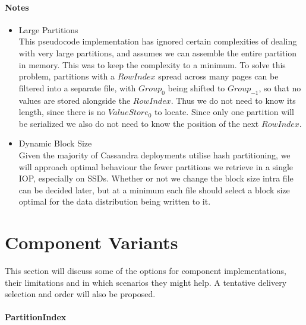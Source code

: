 \documentclass[fleqn]{article}
\begin{document}
\paragraph{Notes}
\small
\begin{itemize}
  \item Large Partitions\\[2pt]
    This pseudocode implementation has ignored certain complexities of dealing with very large
    partitions, and assumes we can assemble the entire partition in memory. This was to keep
    the complexity to a minimum. To solve this problem,
    partitions with a $RowIndex$ spread across many pages can be filtered into a separate
    file, with $Group_0$ being shifted to $Group_{-1}$, so that no values are stored alongside
    the $RowIndex$. Thus we do not need to know its length, since there is no $ValueStore_0$ to locate.
    Since only one partition will be serialized we also do not need to know the position of the next $RowIndex$.
  \item Dynamic Block Size\\[2pt]
    Given the majority of Cassandra deployments utilise hash partitioning, we will approach optimal 
    behaviour the fewer partitions we retrieve in a single IOP, especially on SSDs. Whether or not 
    we change the block size intra file can be decided later, but at a minimum each file should 
    select a block size optimal for the data distribution being written to it.
\end{itemize}

\section{Component Variants}

This section will discuss some of the options for component implementations, their limitations and
in which scenarios they might help. A tentative delivery selection and order will also be proposed.
\\
\paragraph{PartitionIndex}
\end{document}
